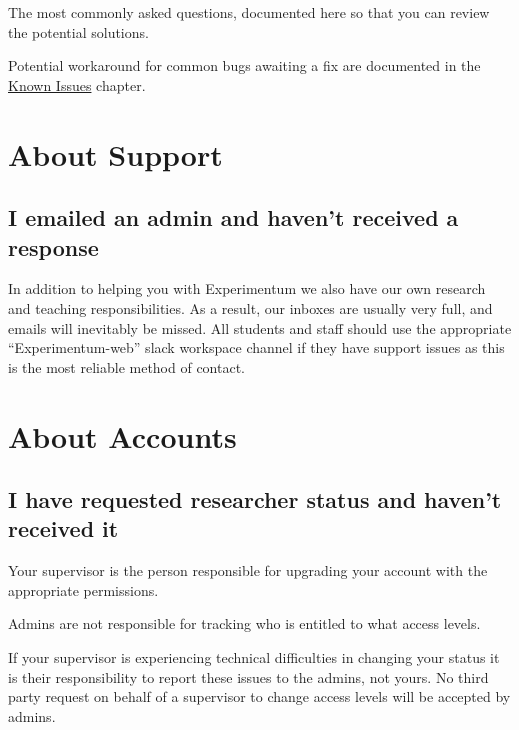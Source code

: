 \documentclass[]{book}
\begin{document}
The most commonly asked questions, documented here so that you can
review the potential solutions.

Potential workaround for common bugs awaiting a fix are documented in
the \protect\hyperlink{knownissues}{Known Issues} chapter.

\section*{About Support}\label{about-support}

\subsection*{I emailed an admin and haven't received a
response}\label{i-emailed-an-admin-and-havent-received-a-response}

In addition to helping you with Experimentum we also have our own
research and teaching responsibilities. As a result, our inboxes are
usually very full, and emails will inevitably be missed. All students
and staff should use the appropriate ``Experimentum-web'' slack
workspace channel if they have support issues as this is the most
reliable method of contact.

\section*{About Accounts}\label{about-accounts}

\subsection*{I have requested researcher status and haven't received
it}\label{i-have-requested-researcher-status-and-havent-received-it}

Your supervisor is the person responsible for upgrading your account
with the appropriate permissions.

Admins are not responsible for tracking who is entitled to what access
levels.

If your supervisor is experiencing technical difficulties in changing
your status it is their responsibility to report these issues to the
admins, not yours. No third party request on behalf of a supervisor to
change access levels will be accepted by admins.
\end{document}
